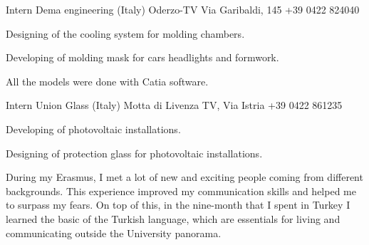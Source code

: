 \documentclass[english,a4paper]{europasscv}
\begin{document}
\begin{europasscv}
		 {
			Intern
		}
		\ecvitem{} {
			Dema engineering (Italy) Oderzo-TV Via Garibaldi,
			145 \newline +39 0422 824040
			\newline {}
		}
		\ecvitem{} {
			\begin{ecvitemize}
				\item Designing of the cooling system for molding chambers.
				\item Developing of molding mask for cars headlights
					and formwork.
				\item All the models were done with Catia software.
			\end{ecvitemize}
		}

		 {
			Intern
		}
		\ecvitem{} {
			Union Glass (Italy) Motta di Livenza TV, Via Istria
			\newline +39 0422 861235
			\newline {}
		}
		\ecvitem{} {
			\begin{ecvitemize}
				\item Developing of photovoltaic installations.
				\item Designing of protection glass for photovoltaic
					installations.
			\end{ecvitemize}
		}



		\ecvlanguageheader
		\ecvlanguagefooter

		 {
			\begin{ecvitemize}
				\item During my Erasmus, I met a lot of new and exciting people
					coming from different backgrounds. This experience improved
					my communication skills and helped me to surpass my fears.
					On top of this, in the nine-month that I spent in Turkey
					I learned the basic of the Turkish language, which are
					essentials for living and communicating outside the
					University panorama.
			\end{ecvitemize}
		}


\end{europasscv}
\end{document}
